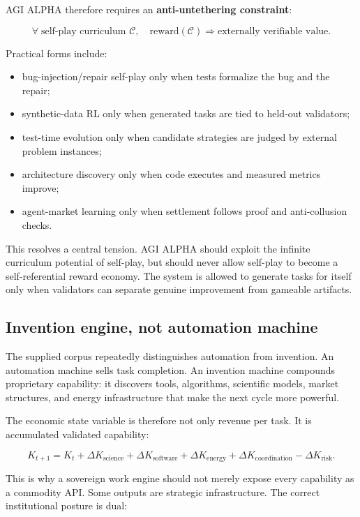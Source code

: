 AGI ALPHA therefore requires an \textbf{anti-untethering constraint}:

\[
\forall \; \text{self-play curriculum } \mathcal{C},
\quad
\text{reward}(\mathcal{C})
\Rightarrow
\text{externally verifiable value}.
\]

Practical forms include:

\begin{itemize}
\tightlist
\item
  bug-injection/repair self-play only when tests formalize the bug and
  the repair;
\item
  synthetic-data RL only when generated tasks are tied to held-out
  validators;
\item
  test-time evolution only when candidate strategies are judged by
  external problem instances;
\item
  architecture discovery only when code executes and measured metrics
  improve;
\item
  agent-market learning only when settlement follows proof and
  anti-collusion checks.
\end{itemize}

This resolves a central tension. AGI ALPHA should exploit the infinite
curriculum potential of self-play, but should never allow self-play to
become a self-referential reward economy. The system is allowed to
generate tasks for itself only when validators can separate genuine
improvement from gameable artifacts.

\subsection{Invention engine, not automation
machine}\label{invention-engine-not-automation-machine}

The supplied corpus repeatedly distinguishes automation from invention.
An automation machine sells task completion. An invention machine
compounds proprietary capability: it discovers tools, algorithms,
scientific models, market structures, and energy infrastructure that
make the next cycle more powerful.

The economic state variable is therefore not only revenue per task. It
is accumulated validated capability:

\[
K_{t+1}
=
K_t
+
\Delta K_{\text{science}}
+
\Delta K_{\text{software}}
+
\Delta K_{\text{energy}}
+
\Delta K_{\text{coordination}}
-
\Delta K_{\text{risk}}.
\]

This is why a sovereign work engine should not merely expose every
capability as a commodity API. Some outputs are strategic
infrastructure. The correct institutional posture is dual:

